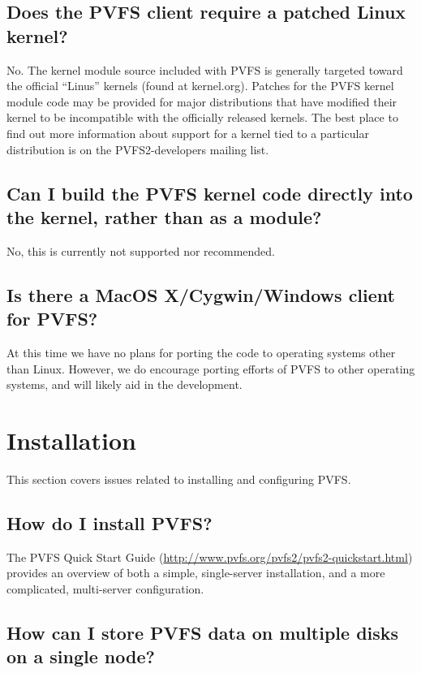 \documentclass[11pt,letterpaper]{article}
\begin{document}
\subsection{Does the PVFS client require a patched Linux kernel?}

No.  The kernel module source included with PVFS is generally
targeted toward the official ``Linus'' kernels (found at kernel.org).
Patches for the PVFS kernel module code may be provided for major
distributions that have modified their kernel to be incompatible with
the officially released kernels.  The best place to find out more
information about support for a kernel tied to a particular
distribution is on the PVFS2-developers mailing list.

\subsection{Can I build the PVFS kernel code directly into the kernel,
            rather than as a module?}

No, this is currently not supported nor recommended.

\subsection{Is there a MacOS X/Cygwin/Windows client for PVFS?}

At this time we have no plans for porting the code to operating
systems other than Linux.  However, we do encourage porting efforts of
PVFS to other operating systems, and will likely aid in the
development.

%
%
\section{Installation}

This section covers issues related to installing and configuring PVFS.

\subsection{How do I install PVFS?}

The PVFS Quick Start Guide
(\url{http://www.pvfs.org/pvfs2/pvfs2-quickstart.html}) provides an overview
of both a simple, single-server installation, and a more complicated,
multi-server configuration.

\subsection{How can I store PVFS data on multiple disks on a single node?}
\label{sec:multiple-disks}
\end{document}
